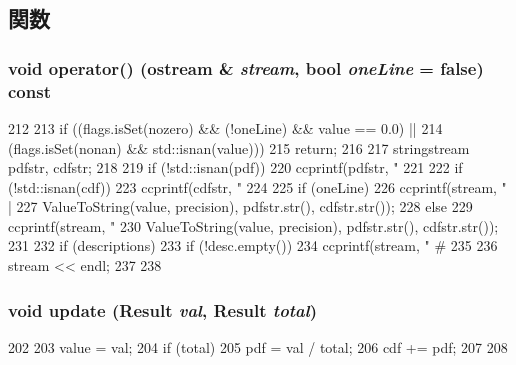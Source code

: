 \subsection{関数}
\hypertarget{structStats_1_1ScalarPrint_a1136524df9fc1bfd82a7b2f37a896310}{
\subsubsection[{operator()}]{\setlength{\rightskip}{0pt plus 5cm}void operator() (ostream \& {\em stream}, \/  bool {\em oneLine} = {\ttfamily false}) const}}
\label{structStats_1_1ScalarPrint_a1136524df9fc1bfd82a7b2f37a896310}



\begin{DoxyCode}
212 {
213     if ((flags.isSet(nozero) && (!oneLine) && value == 0.0) ||
214         (flags.isSet(nonan) && std::isnan(value)))
215         return;
216 
217     stringstream pdfstr, cdfstr;
218 
219     if (!std::isnan(pdf))
220         ccprintf(pdfstr, "%
221 
222     if (!std::isnan(cdf))
223         ccprintf(cdfstr, "%
224 
225     if (oneLine) {
226         ccprintf(stream, " |%
227                  ValueToString(value, precision), pdfstr.str(), cdfstr.str());
228     } else {
229         ccprintf(stream, "%
230                  ValueToString(value, precision), pdfstr.str(), cdfstr.str());
231 
232         if (descriptions) {
233             if (!desc.empty())
234                 ccprintf(stream, " # %
235         }
236         stream << endl;
237     }
238 }
\end{DoxyCode}
\hypertarget{structStats_1_1ScalarPrint_abb30c481bf51f6c908d03a112985912e}{
\subsubsection[{update}]{\setlength{\rightskip}{0pt plus 5cm}void update ({\bf Result} {\em val}, \/  {\bf Result} {\em total})}}
\label{structStats_1_1ScalarPrint_abb30c481bf51f6c908d03a112985912e}



\begin{DoxyCode}
202 {
203     value = val;
204     if (total) {
205         pdf = val / total;
206         cdf += pdf;
207     }
208 }
\end{DoxyCode}


